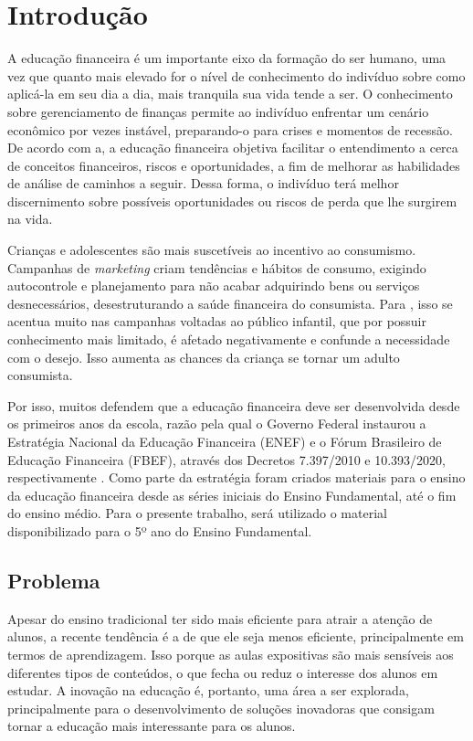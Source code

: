 \chapter{Introdução}

A educação financeira é um importante eixo da formação do ser humano, uma vez que quanto mais elevado for o nível de
conhecimento do indivíduo sobre como aplicá-la em seu dia a dia, mais tranquila sua vida tende a ser. O conhecimento
sobre gerenciamento de finanças permite ao indivíduo enfrentar um cenário econômico por vezes instável, preparando-o
para crises e momentos de recessão. De acordo com a, a educação financeira objetiva facilitar o
entendimento a cerca de conceitos financeiros, riscos e oportunidades, a fim de melhorar as habilidades de análise
de caminhos a seguir. Dessa forma, o indivíduo terá melhor discernimento sobre possíveis oportunidades ou riscos de
perda que lhe surgirem na vida.

Crianças e adolescentes são mais suscetíveis ao incentivo ao consumismo. Campanhas de \textit{marketing} criam
tendências e hábitos de consumo, exigindo autocontrole e planejamento para não acabar adquirindo bens ou serviços
desnecessários, desestruturando a saúde financeira do consumista.
Para , isso se acentua muito nas campanhas voltadas ao público
infantil, que por possuir conhecimento mais limitado, é afetado negativamente e confunde a necessidade com o desejo.
Isso aumenta as chances da criança se tornar um adulto consumista.

Por isso, muitos defendem que a educação financeira deve ser desenvolvida desde os primeiros anos da escola, razão
pela qual o Governo Federal instaurou a Estratégia Nacional da Educação Financeira (ENEF) e o Fórum Brasileiro de
Educação Financeira (FBEF), através dos Decretos 7.397/2010 e 10.393/2020, respectivamente \cite{decreto_10939}.
Como parte da estratégia foram criados materiais para o ensino da educação financeira desde as séries iniciais do
Ensino Fundamental, até o fim do ensino médio. Para o presente trabalho, será utilizado o material disponibilizado
para o 5º ano do Ensino Fundamental\cite{Educacao_financeira_nas_escolas}.

\section{Problema}

Apesar do ensino tradicional ter sido mais eficiente para atrair a atenção de alunos, a recente tendência é a de que
ele seja menos eficiente, principalmente em termos de aprendizagem. Isso porque as aulas expositivas são mais
sensíveis aos diferentes tipos de conteúdos, o que fecha ou reduz o interesse dos alunos em estudar. A inovação na
educação é, portanto, uma área a ser explorada, principalmente para o desenvolvimento de soluções inovadoras que
consigam tornar a educação mais interessante para os alunos.

